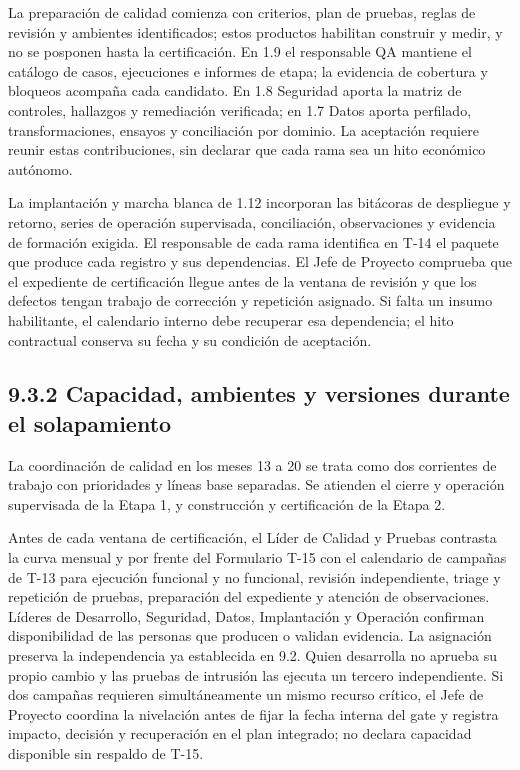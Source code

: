 \documentclass[11pt]{article}
\begin{document}
La preparación de calidad comienza con criterios, plan de pruebas, reglas de revisión y ambientes identificados; estos productos habilitan construir y medir, y no se posponen hasta la certificación. En 1.9 el responsable QA mantiene el catálogo de casos, ejecuciones e informes de etapa; la evidencia de cobertura y bloqueos acompaña cada candidato. En 1.8 Seguridad aporta la matriz de controles, hallazgos y remediación verificada; en 1.7 Datos aporta perfilado, transformaciones, ensayos y conciliación por dominio. La aceptación requiere reunir estas contribuciones, sin declarar que cada rama sea un hito económico autónomo.

La implantación y marcha blanca de 1.12 incorporan las bitácoras de despliegue y retorno, series de operación supervisada, conciliación, observaciones y evidencia de formación exigida. El responsable de cada rama identifica en T-14 el paquete que produce cada registro y sus dependencias. El Jefe de Proyecto comprueba que el expediente de certificación llegue antes de la ventana de revisión y que los defectos tengan trabajo de corrección y repetición asignado. Si falta un insumo habilitante, el calendario interno debe recuperar esa dependencia; el hito contractual conserva su fecha y su condición de aceptación.

\subsection{9.3.2 Capacidad, ambientes y versiones durante el solapamiento}

La coordinación de calidad en los meses 13 a 20 se trata como dos corrientes de trabajo con prioridades y líneas base separadas. Se atienden el cierre y operación supervisada de la Etapa 1, y construcción y certificación de la Etapa 2.

Antes de cada ventana de certificación, el Líder de Calidad y Pruebas contrasta la curva mensual y por frente del Formulario T-15 con el calendario de campañas de T-13 para ejecución funcional y no funcional, revisión independiente, triage y repetición de pruebas, preparación del expediente y atención de observaciones. Líderes de Desarrollo, Seguridad, Datos, Implantación y Operación confirman disponibilidad de las personas que producen o validan evidencia. La asignación preserva la independencia ya establecida en 9.2. Quien desarrolla no aprueba su propio cambio y las pruebas de intrusión las ejecuta un tercero independiente. Si dos campañas requieren simultáneamente un mismo recurso crítico, el Jefe de Proyecto coordina la nivelación antes de fijar la fecha interna del gate y registra impacto, decisión y recuperación en el plan integrado; no declara capacidad disponible sin respaldo de T-15.
\end{document}
